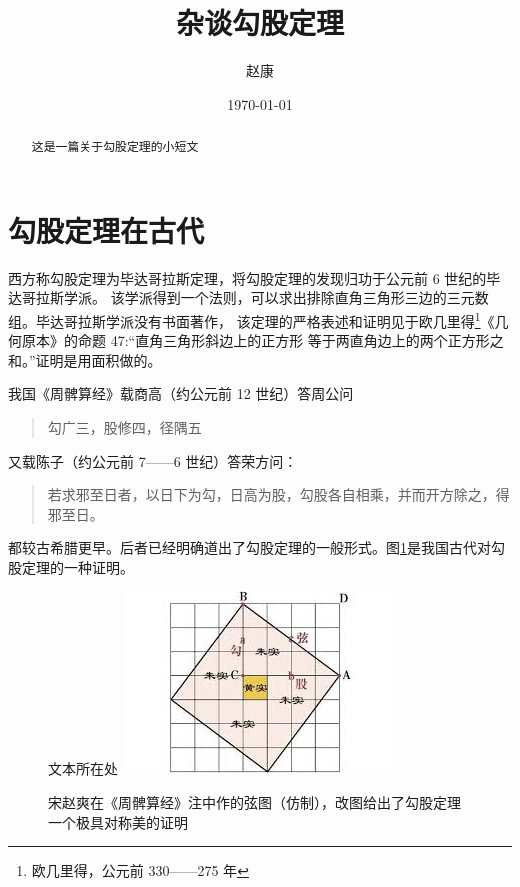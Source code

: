 \documentclass[UTF8]{ctexart} %
\title{杂谈勾股定理}
\author{赵康}
\date{\today}
\begin{document}
\maketitle %
\begin{abstract}
    这是一篇关于勾股定理的小短文 %
\end{abstract}
\tableofcontents %
\section{勾股定理在古代} %
西方称勾股定理为毕达哥拉斯定理，将勾股定理的发现归功于公元前 6 世纪的毕达哥拉斯学派\cite{kline}。
该学派得到一个法则，可以求出排除直角三角形三边的三元数组。毕达哥拉斯学派没有书面著作，
该定理的严格表述和证明见于欧几里得\footnote[1]{欧几里得，公元前 330——275 年}《几何原本》的命题 47:“直角三角形斜边上的正方形
等于两直角边上的两个正方形之和。”证明是用面积做的。


我国《周髀算经》载商高（约公元前 12 世纪）答周公问  %
\begin{quote} %
    \kaishu 勾广三，股修四，径隅五 %
\end{quote}
又载陈子（约公元前 7——6 世纪）答荣方问：
\begin{quote}
    \kaishu 若求邪至日者，以日下为勾，日高为股，勾股各自相乘，并而开方除之，得邪至日。
\end{quote}
都较古希腊更早。后者已经明确道出了勾股定理的一般形式。图\ref{fig:xiantu}是我国古代对勾股定理的一种证明\cite{shanggao}。
\begin{figure}[ht] %
    \centering %
    文本所在处
    \includegraphics[scale=0.6]{xiantu.jpeg}
    \caption[short]{宋赵爽在《周髀算经》注中作的弦图（仿制），改图给出了勾股定理一个极具对称美的证明} %
    \label{fig:xiantu} %
\end{figure}
\end{document}
